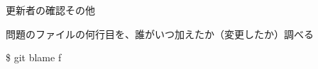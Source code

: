 % 
% 
% 
% 

\begin{frame}[t]{更新者の確認}{その他}

  問題のファイルの何行目を、誰がいつ加えたか（変更したか）調べる
  \vspace{4ex}

  \$ git blame f
  \vspace{2ex}

\end{frame}
